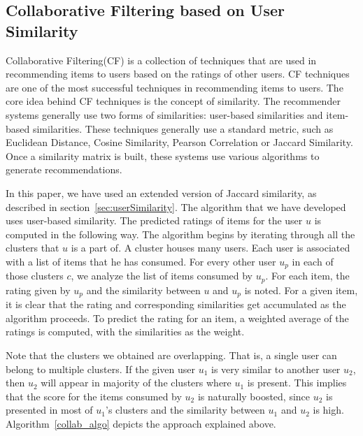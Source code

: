 \documentclass{acm_proc_article-sp}
\begin{document}

\subsection{Collaborative Filtering based on User Similarity}
\label{sec:collab}
Collaborative Filtering(CF) is a collection of techniques that are used in recommending items to users based on the ratings of other users. CF techniques are one of the most successful techniques in recommending items to users. The core idea behind CF techniques is the concept of similarity. The recommender systems generally use two forms of similarities: user-based similarities and item-based similarities. These techniques generally use a standard metric, such as Euclidean Distance, Cosine Similarity, Pearson Correlation or Jaccard Similarity. Once a similarity matrix is built, these systems use various algorithms to generate recommendations.

In this paper, we have used an extended version of Jaccard similarity, as described in section~\ref{sec:userSimilarity}. The algorithm that we have developed uses user-based similarity. The predicted ratings of items for the user $u$ is computed in the following way. The algorithm begins by iterating through all the clusters that $u$ is a part of. A cluster houses many users. Each user is associated with a list of items that he has consumed. For every other user $u_p$ in each of those clusters $c$, we analyze the list of items consumed by $u_p$. For each item, the rating given by $u_p$ and the similarity between $u$ and $u_p$ is noted. For a given item, it is clear that the rating and corresponding similarities get accumulated as the algorithm proceeds. To predict the rating for an item, a weighted average of the ratings is computed, with the similarities as the weight.

Note that the clusters we obtained are overlapping. That is, a single user can belong to multiple clusters. If the given user $u_1$ is very similar to another user $u_2$, then $u_2$ will appear in majority of the clusters where $u_1$ is present. This implies that the score for the items consumed by $u_2$ is naturally boosted, since $u_2$ is presented in most of $u_1$'s clusters and the similarity between $u_1$ and $u_2$ is high. Algorithm~\ref{collab_algo} depicts the approach explained above.
\end{document}
